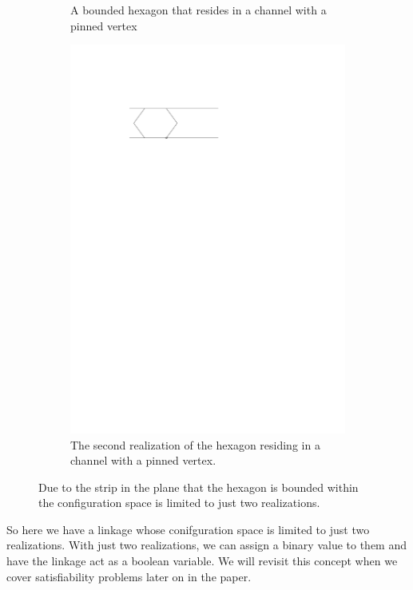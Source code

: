 \begin{figure}[h]
\begin{center}
\begin{subfigure}[b]{0.49\textwidth}
	  \caption{A bounded hexagon that resides in a channel with a pinned vertex}
	  \label{fig:linkage-1-1}
  \end{subfigure}
  \begin{subfigure}[b]{0.49\textwidth}
	  \includegraphics[width=\textwidth]{graphics/hexagonInChannelWithPinnedJointLeft.pdf}
	  \caption{The second realization of the hexagon residing in a channel with a pinned vertex.}
	  \label{fig:linkage-1-2}
  \end{subfigure}
\end{center} 
\caption{Due to the strip in the plane that the hexagon is bounded within the configuration space is limited to just two realizations.}\label{fig:linkage-1}
\end{figure}
So here we have a linkage whose conifguration space is limited to just two realizations.  With just two realizations, we can assign a binary value to them and have the linkage act as a boolean variable.  We will revisit this concept when we cover satisfiability problems later on in the paper.
